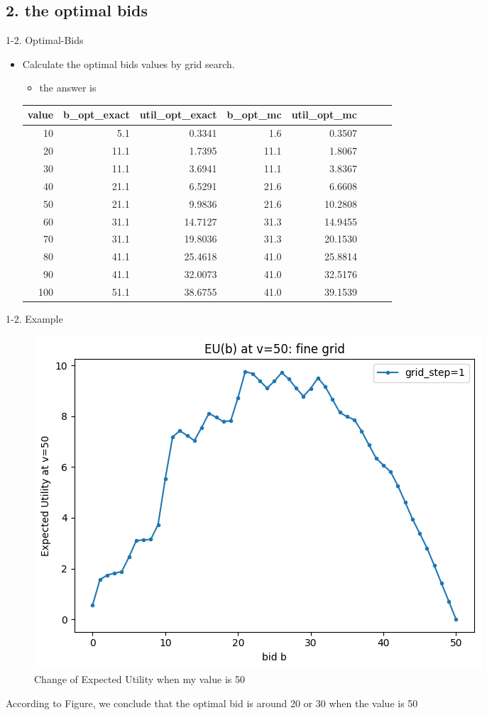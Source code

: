 \documentclass{beamer}
\begin{document}
\subsection{2. the optimal bids}
\begin{frame}{1-2. Optimal-Bids}
\begin{itemize}
    \item Calculate the optimal bids values by grid search.
    \begin{itemize}
        \item the answer is 
    \end{itemize} 
        {\small
        \begin{center}
        \begin{tabular}{@{}rrrrrrrr@{}}
        \toprule
        value & b\_opt\_exact & util\_opt\_exact & b\_opt\_mc & util\_opt\_mc \\
        \midrule
        10  &  5.1 &  0.3341 &  1.6 &  0.3507 \\
        20  & 11.1 &  1.7395 & 11.1 &  1.8067 \\
        30  & 11.1 &  3.6941 & 11.1 &  3.8367 \\
        40  & 21.1 &  6.5291 & 21.6 &  6.6608 \\
        50  & 21.1 &  9.9836 & 21.6 & 10.2808 \\
        60  & 31.1 & 14.7127 & 31.3 & 14.9455 \\
        70  & 31.1 & 19.8036 & 31.3 & 20.1530 \\
        80  & 41.1 & 25.4618 & 41.0 & 25.8814 \\
        90  & 41.1 & 32.0073 & 41.0 & 32.5176 \\
        100 & 51.1 & 38.6755 & 41.0 & 39.1539 \\
        \bottomrule
        \end{tabular}
        \end{center}}
\end{itemize}
\end{frame}

\begin{frame}{1-2. Example}
    \begin{figure}
        \centering
        \includegraphics[width=0.6\linewidth]{332Project1//figures/EU_plot_revised.png}
        \caption{Change of Expected Utility when my value is 50}
        \label{fig:placeholder}
    \end{figure}
    According to Figure, we conclude that the optimal bid is around 20 or 30 when the value is 50 
\end{frame}
\end{document}
